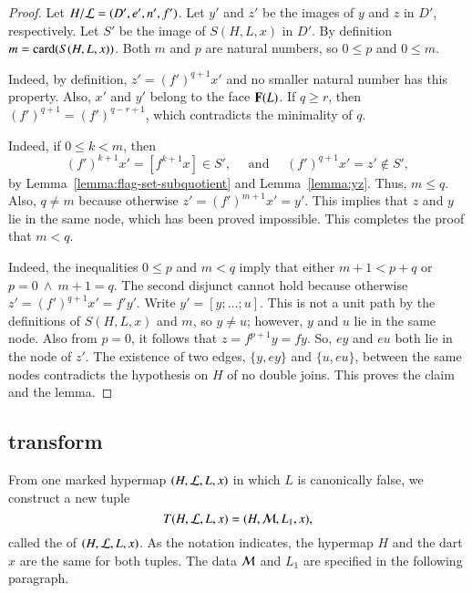 \begin{proof}
Let $H/{\cal L}=(D',e',n',f')$.  Let $y'$ and $z'$ be the images of $y$ and $z$
in $D'$, respectively.  Let $S'$ be the image of $S(H,L,x)$ in $D'$.
By definition $m = {\operatorname{card}}(S(H,L,x))$.  Both $m$ and $p$ are natural numbers,
so $0\le p$ and $0\le m$. 


  Indeed,
by definition, $z' = (f')^{q+1} x'$ and no smaller natural
number has this property.  Also, $x'$ and $y'$ belong to the face ${\mathbf F}(L)$.
If $q\ge r$, then $(f')^{q+1} = (f')^{q-r+1}$, which contradicts the minimality of $q$.

 Indeed, if $0\le k< m$, then
\[ 
(f')^{k+1} x' = [f^{k+1} x]\in S',\quad \text{ and }\quad (f')^{q+1}x' = z'\not\in S',
\] 
by Lemma~\ref{lemma:flag-set-subquotient} and Lemma~\ref{lemma:yz}.
Thus, $m\le q$.  Also, $q\ne m$ because otherwise $z' = (f')^{m+1} x'
= y'$.  This implies that $z$ and $y$ lie in the same node, which has
been proved impossible.  This completes the proof that $m<q$.
 
  Indeed, the inequalities $0\le p$ and $m<q$ imply
that either $m+1 < p+q$ or $p=0~\land~m+1=q$.  The second disjunct
cannot hold because otherwise $z' = (f')^{q+1} x' = f' y'$.  Write $y' = [y;\ldots;u]$.
This is not a unit path by the definitions of $S(H,L,x)$ and $m$, so $y\ne u$; however,
$y$ and $u$ lie in the same node.  Also from $p=0$, it follows that $z= f^{p+1} y = f y$.
So, $e y$ and $e u$ both lie in the node of $z'$.  The existence of
 two edges, $\{y, e y\}$ and
$\{u, e u\}$, between the same nodes contradicts the hypothesis
on $H$ of no double joins.  This proves the claim and the lemma.
\end{proof}

\subsection{transform}

%
\begin{definition}[transform]\label{def:transform}
  From one marked hypermap $(H,{\cal L},L,x)$ in which $L$ is
  canonically false, we construct a new tuple
\[ 
T(H,{\cal L},L,x) = (H,{\cal M},L_1,x),
\] 
 called the  of
  $(H,{\cal{L}},L,x)$.  
As the notation indicates, the hypermap $H$ and the dart $x$ are the same for both
tuples.  The data ${\cal M}$ and $L_1$ are specified in
the following paragraph.
\end{definition}

